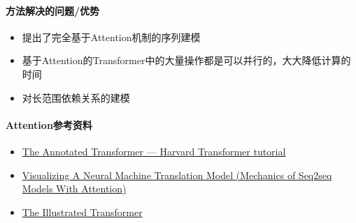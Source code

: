 \paragraph{方法解决的问题/优势}

\begin{itemize}

	\item 提出了完全基于Attention机制的序列建模
	\item 基于Attention的Transformer中的大量操作都是可以并行的，大大降低计算的时间
	\item 对长范围依赖关系的建模

\end{itemize}





\paragraph{Attention参考资料}
\begin{itemize}
	\item \href{http://nlp.seas.harvard.edu/2018/04/03/attention.html}{The Annotated Transformer --- Harvard Transformer tutorial}
	\item \href{https://jalammar.github.io/visualizing-neural-machine-translation-mechanics-of-seq2seq-models-with-attention/}{Visualizing A Neural Machine Translation Model (Mechanics of Seq2seq Models With Attention)}
	\item \href{https://jalammar.github.io/illustrated-transformer/}{The Illustrated Transformer}
\end{itemize}



